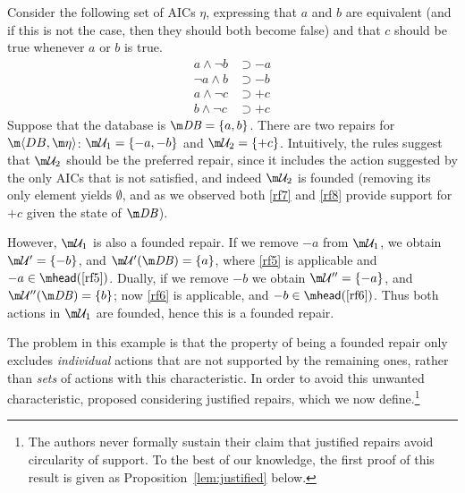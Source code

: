 \begin{example}
  \label{ex:founded}
  Consider the following set of AICs $\eta$, expressing that $a$ and $b$ are equivalent (and if this is not the case, then they should both become false) and that $c$ should be true whenever $a$ or $b$ is true.
  \begin{align}
    a\land\neg b &\supset{-a} \label{rf5} \\
    \neg a\land b &\supset{-b} \label{rf6} \\
    a\land\neg c &\supset{+c} \label{rf7} \\
    b\land\neg c &\supset{+c} \label{rf8} 
  \end{align}
  Suppose that the database is $\db=\{a,b\}$.
  There are two repairs for $\fulldb$: $\UU_1=\{{-a},{-b}\}$ and $\UU_2=\{{+c}\}$.
  Intuitively, the rules suggest that $\UU_2$ should be the preferred repair, since it includes the action suggested by the only AICs that is not satisfied, and indeed $\UU_2$ is founded (removing its only element yields $\emptyset$, and as we observed both \ref{rf7} and \ref{rf8} provide support for ${+c}$ given the state of $\db$).

  However, $\UU_1$ is also a founded repair.
  If we remove ${-a}$ from $\UU_1$, we obtain $\UU'=\{{-b}\}$, and $\UU'(\db)=\{a\}$, where \ref{rf5} is applicable and ${-a}\in\head(\ref{rf5})$.
  Dually, if we remove ${-b}$ we obtain $\UU''=\{{-a}\}$, and $\UU''(\db)=\{b\}$; now \ref{rf6} is applicable, and ${-b}\in\head(\ref{rf6})$.
  Thus both actions in $\UU_1$ are founded, hence this is a founded repair.
\end{example}

The problem in this example is that the property of being a founded repair only excludes \emph{individual} actions that are not supported by the remaining ones, rather than \emph{sets} of actions with this characteristic.
In order to avoid this unwanted characteristic, \citet{tplp/CaropreseT11} proposed considering justified repairs, which we now define.\footnote{The authors never formally sustain their claim that justified repairs avoid circularity of support.  To the best of our knowledge, the first proof of this result is given as Proposition~\ref{lem:justified} below.}

